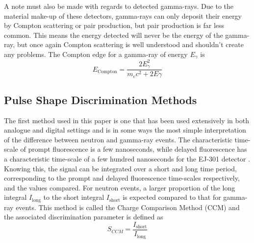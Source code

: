 \documentclass[11pt]{article}
\numberwithin{equation}{section}
\numberwithin{figure}{section}
\numberwithin{table}{section}
\begin{document}
\par A note must also be made with regards to detected gamma-rays. Due to the material make-up of these detectors, gamma-rays can only deposit their energy by Compton scattering or pair production, but pair production is far less common. This means the energy detected will never be the energy of the gamma-ray, but once again Compton scattering is well understood and shouldn't create any problems. The Compton edge for a gamma-ray of energy $E_\gamma$ is
\begin{equation}
    E_{\mathrm{Compton}} = \frac{2E_\gamma^2}{m_ec^2+2E\gamma}
    \label{eqn:Compton Edge}
\end{equation}

\subsection{Pulse Shape Discrimination Methods}
\par The first method used in this paper is one that has been used extensively in both analogue and digital settings and is in some ways the most simple interpretation of the difference between neutron and gamma-ray events. The characteristic time-scale of prompt fluorescence is a few nanoseconds, while delayed fluorescence has a characteristic time-scale of a few hundred nanoseconds for the EJ-301 detector \cite{Kuchnir}. Knowing this, the signal can be integrated over a short and long time period, corresponding to the prompt and delayed fluorescence time-scales respectively, and the values compared. For neutron events, a larger proportion of the long integral $I_{\mathrm{long}}$ to the short integral $I_{\mathrm{short}}$ is expected compared to that for gamma-ray events. This method is called the Charge Comparison Method (CCM) and the associated discrimination parameter is defined as 
\begin{equation}
    S_{CCM}=\frac{I_{\mathrm{short}}}{I_{\mathrm{long}}}
    \label{eqn:CCM parameter}
\end{equation}
\end{document}
